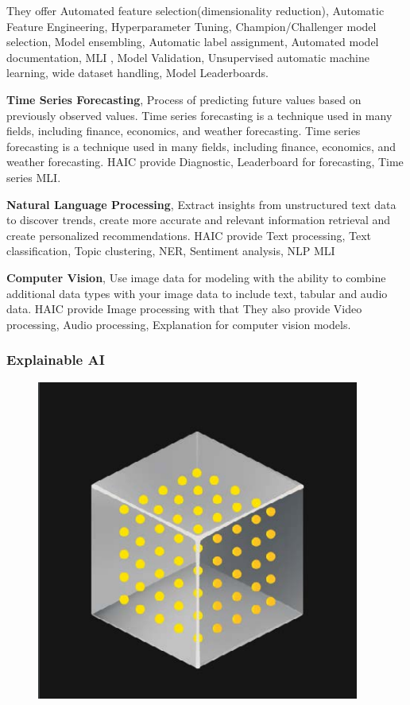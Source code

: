 \documentclass[12pt,a4paper]{report}
\begin{document}
They offer Automated feature selection(dimensionality reduction), Automatic Feature Engineering, Hyperparameter Tuning, Champion/Challenger model selection, Model ensembling, Automatic label assignment, Automated model documentation, \ac{MLI} , Model Validation, Unsupervised automatic machine learning, wide dataset handling, Model Leaderboards.

\textbf{Time Series Forecasting}, Process of predicting future values based on previously observed 
values. Time series forecasting is a technique used in many fields, including finance, economics, 
and weather forecasting. Time series forecasting is a technique used in many fields, including 
finance, economics, and weather forecasting. HAIC provide Diagnostic, Leaderboard for forecasting, 
Time series \ac{MLI}.

\textbf{Natural Language Processing}, Extract insights from unstructured text data to
discover trends, create more accurate and relevant information retrieval and create
personalized recommendations. HAIC provide Text processing, Text classification, Topic clustering, 
\ac{NER}, Sentiment analysis, NLP \ac{MLI}

\textbf{Computer Vision}, Use image data for modeling with the ability to combine additional data
types with your image data to include text, tabular and audio data. HAIC provide Image processing with 
that They also provide Video processing, Audio processing, Explanation for computer vision models.

\clearpage
\subsubsection{Explainable AI}

\begin{figure}
\includegraphics[width=1\linewidth]{exai.png}
\end{figure}
\end{document}
